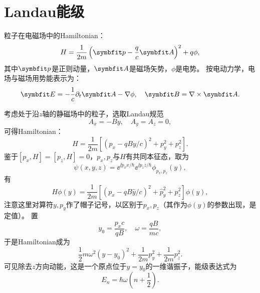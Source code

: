 \section{Landau能级}

粒子在电磁场中的Hamiltonian：
\begin{equation}
    H = \frac{1}{2m}\left(\pp-\frac{q}{c}\AA\right)^2 + q\phi,
\end{equation}
其中$\pp$是正则动量，$\AA$是磁场矢势，$\phi$是电势。
按电动力学，电场与磁场用势能表示为：
\begin{equation}
    \bm{E} = -\frac1c \pd_t \AA - \nabla \phi, \quad
    \bm{B} = \nabla \times \AA.
\end{equation}

考虑处于沿$z$轴的静磁场中的粒子，选取Landau规范
\begin{equation}
    A_x = -By, \quad A_y = A_z = 0,
\end{equation}
可得Hamiltonian：
\begin{equation}
    H = \frac{1}{2m}\left[ (p_x-qBy/c)^2 + p_y^2 + p_z^2 \right].
\end{equation}
鉴于$[p_x,H]=[p_z,H]=0$，$p_x,p_z$与$H$有共同本征态，取为
\begin{equation}
    \psi(x,y,z) = \ee^{\ii p_x x/\hbar} \ee^{\ii p_z z/\hbar} \phi_{p_x,p_z}(y),
\end{equation}
有
\begin{equation}
    H \phi(y) = \frac{1}{2m}\left[ (p_x-qB\hat{y}/c)^2 + \hat{p}_y^2 + p_z^2 \right] \phi(y),
\end{equation}
注意这里对算符$y,p_y$作了帽子记号，以区别于$p_x,p_z$（其作为$\phi(y)$的参数出现，是定值）。
置
\begin{equation}
    y_0 = \frac{p_x c}{qB}, \quad \omega = \frac{qB}{mc},
\end{equation}
于是Hamiltonian成为
\begin{equation}
    \frac12 m\omega^2 (y-y_0)^2 + \frac{1}{2m}p_y^2 + \frac{1}{2m}p_z^2.
\end{equation}
可见除去$z$方向动能，这是一个原点位于$y=y_0$的一维谐振子，能级表达式为
\begin{equation}
    E_n = \hbar \omega \left( n + \frac12 \right).
\end{equation}
